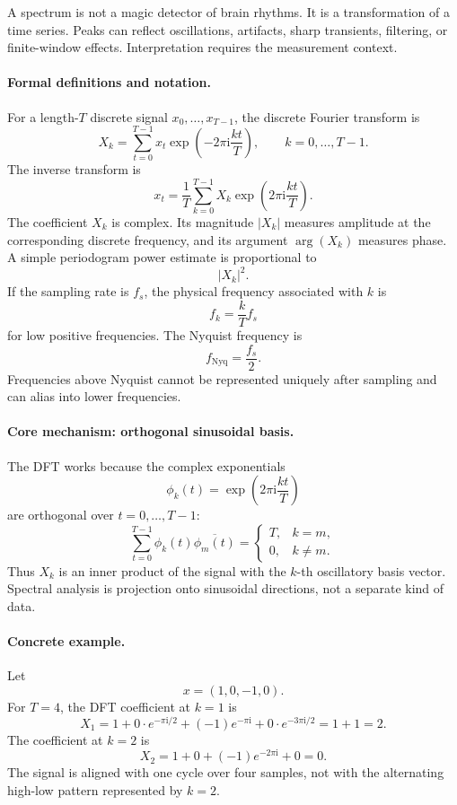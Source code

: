 A spectrum is not a magic detector of brain rhythms. It is a transformation of a time series. Peaks can reflect oscillations, artifacts, sharp transients, filtering, or finite-window effects. Interpretation requires the measurement context.

\paragraph{Formal definitions and notation.}
For a length-\(T\) discrete signal \(x_0,\ldots,x_{T-1}\), the discrete Fourier transform is
\[
\boxed{
X_k=\sum_{t=0}^{T-1}x_t\exp\!\left(-2\pi \mathrm{i}\frac{kt}{T}\right),
\qquad k=0,\ldots,T-1.
}
\]
The inverse transform is
\[
x_t=\frac1T\sum_{k=0}^{T-1}X_k\exp\!\left(2\pi \mathrm{i}\frac{kt}{T}\right).
\]
The coefficient \(X_k\) is complex. Its magnitude \(|X_k|\) measures amplitude at the corresponding discrete frequency, and its argument \(\arg(X_k)\) measures phase. A simple periodogram power estimate is proportional to
\[
|X_k|^2.
\]
If the sampling rate is \(f_s\), the physical frequency associated with \(k\) is
\[
f_k=\frac{k}{T}f_s
\]
for low positive frequencies. The Nyquist frequency is
\[
f_{\mathrm{Nyq}}=\frac{f_s}{2}.
\]
Frequencies above Nyquist cannot be represented uniquely after sampling and can alias into lower frequencies.

\paragraph{Core mechanism: orthogonal sinusoidal basis.}
The DFT works because the complex exponentials
\[
\phi_k(t)=\exp\!\left(2\pi \mathrm{i}\frac{kt}{T}\right)
\]
are orthogonal over \(t=0,\ldots,T-1\):
\[
\sum_{t=0}^{T-1}\phi_k(t)\overline{\phi_m(t)}
=
\begin{cases}
T, & k=m,\\
0, & k\neq m.
\end{cases}
\]
Thus \(X_k\) is an inner product of the signal with the \(k\)-th oscillatory basis vector. Spectral analysis is projection onto sinusoidal directions, not a separate kind of data.

\paragraph{Concrete example.}
Let
\[
x=(1,0,-1,0).
\]
For \(T=4\), the DFT coefficient at \(k=1\) is
\[
X_1=1+0\cdot e^{-\pi\mathrm{i}/2}+(-1)e^{-\pi\mathrm{i}}+0\cdot e^{-3\pi\mathrm{i}/2}=1+1=2.
\]
The coefficient at \(k=2\) is
\[
X_2=1+0+(-1)e^{-2\pi\mathrm{i}}+0=0.
\]
The signal is aligned with one cycle over four samples, not with the alternating high-low pattern represented by \(k=2\).

